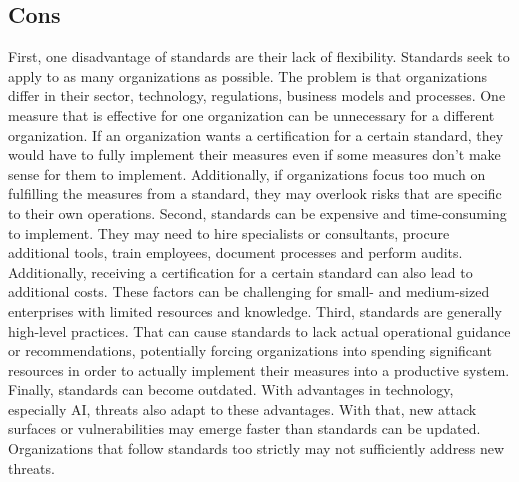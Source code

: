 \documentclass[12pt]{article}
\begin{document}
\subsection{Cons}
First, one disadvantage of standards are their lack of flexibility. Standards seek to apply to as many organizations as possible. The problem is that organizations differ in their sector, technology, regulations, business models and processes. One measure that is effective for one organization can be unnecessary for a different organization. If an organization wants a certification for a certain standard, they would have to fully implement their measures even if some measures don't make sense for them to implement. Additionally, if organizations focus too much on fulfilling the measures from a standard, they may overlook risks that are specific to their own operations.
\newline
Second, standards can be expensive and time-consuming to implement. They may need to hire specialists or consultants, procure additional tools, train employees, document processes and perform audits. Additionally, receiving a certification for a certain standard can also lead to additional costs. These factors can be challenging for small- and medium-sized enterprises with limited resources and knowledge.
\newline
Third, standards are generally high-level practices. That can cause standards to lack actual operational guidance or recommendations, potentially forcing organizations into spending significant resources in order to actually implement their measures into a productive system.
\newline
Finally, standards can become outdated. With advantages in technology, especially AI, threats also adapt to these advantages. With that, new attack surfaces or vulnerabilities may emerge faster than standards can be updated. Organizations that follow standards too strictly may not sufficiently address new threats. 
\end{document}
